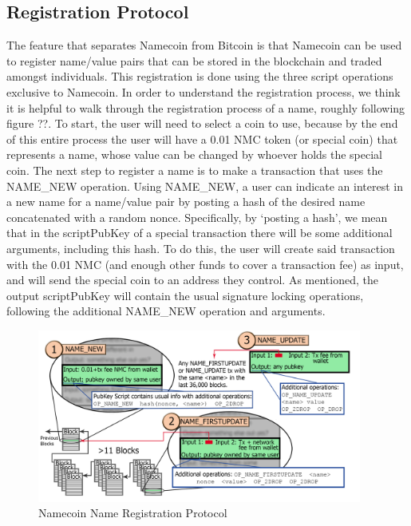 \subsection{Registration Protocol}
The feature that separates Namecoin from Bitcoin is that Namecoin can be used to register name/value pairs that can be stored in the blockchain and traded amongst individuals. This registration is done using the three script operations exclusive to Namecoin. In order to understand the registration process, we think it is helpful to walk through the registration process of a name, roughly following figure ??. To start, the user will need to select a coin to use, because by the end of this entire process the user will have a 0.01 NMC token (or special coin) that represents a name, whose value can be changed by whoever holds the special coin. The next step to register a name is to make a transaction that uses the NAME\_NEW  operation. Using NAME\_NEW, a user can indicate an interest in a new name for a name/value pair by posting a hash of the desired name concatenated with a random nonce. Specifically, by ‘posting a hash', we mean that in the scriptPubKey of a special transaction there will be some additional arguments, including this hash. To do this, the user will create said transaction with the 0.01 NMC (and enough other funds to cover a transaction fee) as input, and will send the special coin to an address they control. As mentioned, the output scriptPubKey will contain the usual signature locking operations, following the additional NAME\_NEW operation and arguments.

\begin{figure}
  \centering
  \includegraphics[width=0.95\textwidth]{registration.png}
  \caption{Namecoin Name Registration Protocol}
  \label{fig:registration}
\end{figure}


